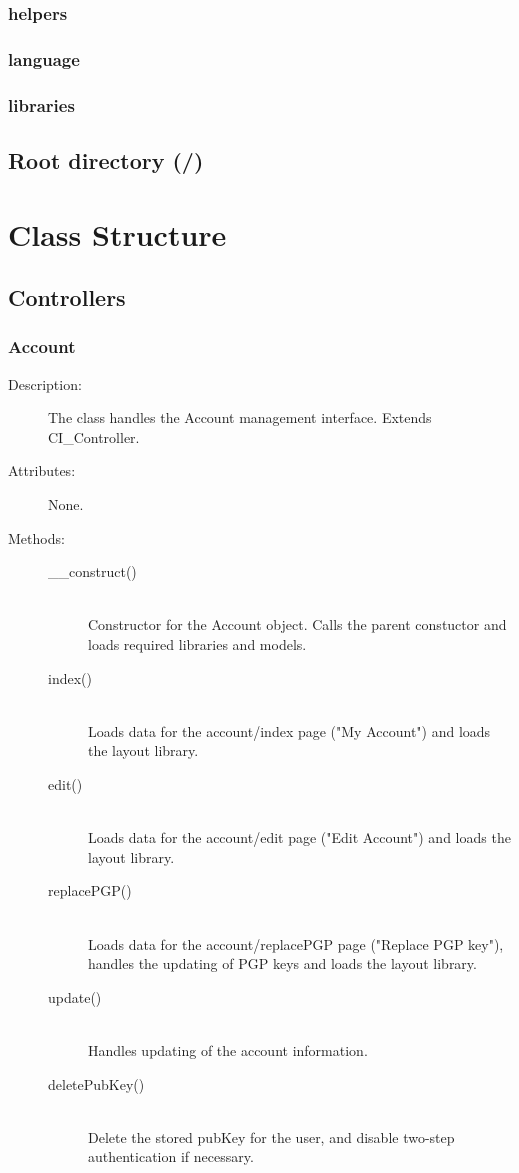 \documentclass[11pt]{article} %
\begin{document}
\subsubsection*{helpers}
\subsubsection*{language}
\subsubsection*{libraries}
\subsection{Root directory (/)}
\newpage

\section{Class Structure}
\subsection{Controllers}
\subsubsection{Account}
\begin{description}
\item[Description:] The class handles the Account management interface. Extends CI\_Controller.
\item[Attributes:] None.
\item[Methods:] \textbf{ }
\begin{description}
\item[\_\_construct()]  \textbf{ }\\
Constructor for the Account object. Calls the parent constuctor and loads required libraries and models.
\item[index()]  \textbf{ }\\
Loads data for the account/index page ("My Account") and loads the layout library.
\item[edit()]  \textbf{ }\\
Loads data for the account/edit page ("Edit Account") and loads the layout library.
\item[replacePGP()]  \textbf{ }\\
Loads data for the account/replacePGP page ("Replace PGP key"), handles the updating of PGP keys and loads the layout library.
\item[update()]  \textbf{ } \\
Handles updating of the account information.
\item[deletePubKey()]  \textbf{ }\\
Delete the stored pubKey for the user, and disable two-step authentication if necessary.
\end{description} 
\end{description} 
\end{document}
